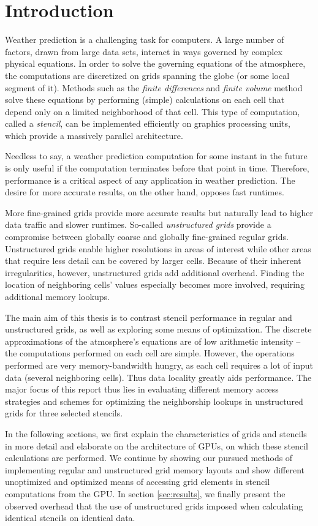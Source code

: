 \chapter{Introduction}

Weather prediction is a challenging task for computers. A large number of factors, drawn from large data sets, interact in ways governed by complex physical equations. In order to solve the governing equations of the atmosphere, the computations are discretized on grids spanning the globe (or some local segment of it). Methods such as the \emph{finite differences} and \emph{finite volume} method solve these equations by performing (simple) calculations on each cell that depend only on a limited neighborhood of that cell. This type of computation, called a \emph{stencil}, can be implemented efficiently on graphics processing units, which provide a massively parallel architecture. 

Needless to say, a weather prediction computation for some instant in the future is only useful if the computation terminates before that point in time. Therefore, performance is a critical aspect of any application in weather prediction. The desire for more accurate results, on the other hand, opposes fast runtimes.

More fine-grained grids provide more accurate results but naturally lead to higher data traffic and slower runtimes. So-called \emph{unstructured grids} provide a compromise between globally coarse and globally fine-grained regular grids. Unstructured grids enable higher resolutions in areas of interest while other areas that require less detail can be covered by larger cells. Because of their inherent irregularities, however, unstructured grids add additional overhead. Finding the location of neighboring cells' values especially becomes more involved, requiring additional memory lookups.

The main aim of this thesis is to contrast stencil performance in regular and unstructured grids, as well as exploring some means of optimization. The discrete approximations of the atmosphere's equations are of low arithmetic intensity -- the computations performed on each cell are simple. However, the operations performed are very memory-bandwidth hungry, as each cell requires a lot of input data (several neighboring cells). Thus data locality greatly aids performance. The major focus of this report thus lies in evaluating different memory access strategies and schemes for optimizing the neighborship lookups in unstructured grids for three selected stencils.

In the following sections, we first explain the characteristics of grids and stencils in more detail and elaborate on the architecture of GPUs, on which these stencil calculations are performed. We continue by showing our pursued methods of implementing regular and unstructured grid memory layouts and show different unoptimized and optimized means of accessing grid elements in stencil computations from the GPU. In section \ref{sec:results}, we finally present the observed overhead that the use of unstructured grids imposed when calculating identical stencils on identical data.